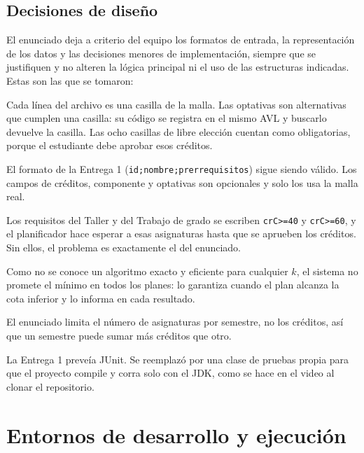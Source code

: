 \documentclass[11pt,letterpaper]{article}
\begin{document}
\subsection{Decisiones de diseño}\label{sec:decisiones}
El enunciado deja a criterio del equipo los formatos de entrada, la representación de los datos y las decisiones menores de implementación, siempre que se justifiquen y no alteren la lógica principal ni el uso de las estructuras indicadas. Estas son las que se tomaron:
\begin{description}[leftmargin=0pt, style=sameline]
\item[Asignaturas obligatorias como casillas.] Cada línea del archivo es una casilla de la malla. Las optativas son alternativas que cumplen una casilla: su código se registra en el mismo AVL y buscarlo devuelve la casilla. Las ocho casillas de libre elección cuentan como obligatorias, porque el estudiante debe aprobar esos créditos.
\item[Formato extendido y compatible.] El formato de la Entrega 1 (\texttt{id;nombre;prerrequisitos}) sigue siendo válido. Los campos de créditos, componente y optativas son opcionales y solo los usa la malla real.
\item[Requisitos de créditos.] Los requisitos del Taller y del Trabajo de grado se escriben \texttt{crC>=40} y \texttt{crC>=60}, y el planificador hace esperar a esas asignaturas hasta que se aprueben los créditos. Sin ellos, el problema es exactamente el del enunciado.
\item[Heurística con certificado.] Como no se conoce un algoritmo exacto y eficiente para cualquier $k$, el sistema no promete el mínimo en todos los planes: lo garantiza cuando el plan alcanza la cota inferior y lo informa en cada resultado.
\item[Sin límite de créditos por semestre.] El enunciado limita el número de asignaturas por semestre, no los créditos, así que un semestre puede sumar más créditos que otro.
\item[Pruebas sin JUnit.] La Entrega 1 preveía JUnit. Se reemplazó por una clase de pruebas propia para que el proyecto compile y corra solo con el JDK, como se hace en el video al clonar el repositorio.
\end{description}

\section{Entornos de desarrollo y ejecución}\label{sec:entornos}
\end{document}
